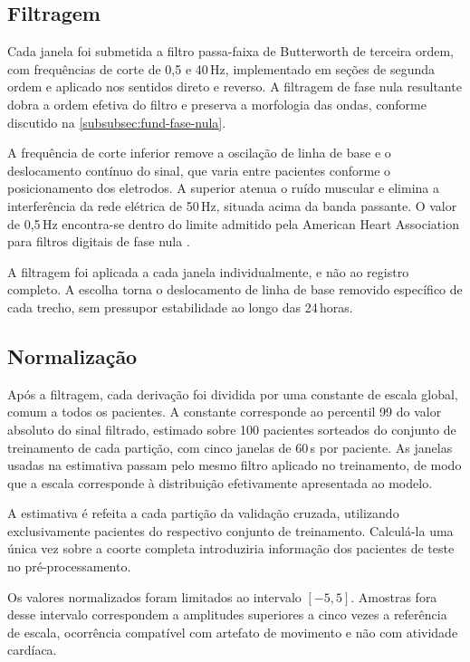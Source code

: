 \subsection{Filtragem}
\label{subsec:met-filtragem}

Cada janela foi submetida a filtro passa-faixa de Butterworth de terceira
ordem, com frequências de corte de 0,5 e 40\,Hz, implementado em seções de
segunda ordem e aplicado nos sentidos direto e reverso. A filtragem de fase
nula resultante dobra a ordem efetiva do filtro e preserva a morfologia das
ondas, conforme discutido na \autoref{subsubsec:fund-fase-nula}.

A frequência de corte inferior remove a oscilação de linha de base e o
deslocamento contínuo do sinal, que varia entre pacientes conforme o
posicionamento dos eletrodos. A superior atenua o ruído muscular e elimina a
interferência da rede elétrica de 50\,Hz, situada acima da banda passante. O
valor de 0,5\,Hz encontra-se dentro do limite admitido pela American Heart
Association para filtros digitais de fase nula
\cite{kligfield2007recommendations}.

A filtragem foi aplicada a cada janela individualmente, e não ao registro
completo. A escolha torna o deslocamento de linha de base removido
específico de cada trecho, sem pressupor estabilidade ao longo das 24\,horas.

\subsection{Normalização}
\label{subsec:met-normalizacao}

Após a filtragem, cada derivação foi dividida por uma constante de escala
global, comum a todos os pacientes. A constante corresponde ao percentil 99
do valor absoluto do sinal filtrado, estimado sobre 100 pacientes sorteados
do conjunto de treinamento de cada partição, com cinco janelas de 60\,s por
paciente. As janelas usadas na estimativa passam pelo mesmo filtro aplicado
no treinamento, de modo que a escala corresponde à distribuição efetivamente
apresentada ao modelo.

A estimativa é refeita a cada partição da validação cruzada, utilizando
exclusivamente pacientes do respectivo conjunto de treinamento. Calculá-la
uma única vez sobre a coorte completa introduziria informação dos pacientes
de teste no pré-processamento.

Os valores normalizados foram limitados ao intervalo $[-5, 5]$. Amostras fora
desse intervalo correspondem a amplitudes superiores a cinco vezes a
referência de escala, ocorrência compatível com artefato de movimento e não
com atividade cardíaca.


